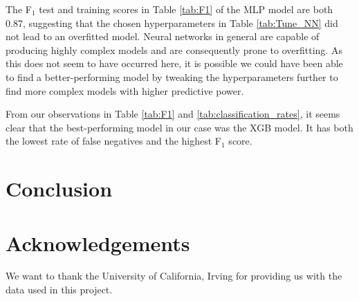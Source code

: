 \documentclass[a4paper, 11pt, twocolumn]{article}
\begin{document}
The F$_1$ test and training scores in Table \ref{tab:F1} of the MLP model are 
both 0.87, suggesting that the chosen hyperparameters in Table 
\ref{tab:Tune_NN} did not lead to an overfitted model. Neural networks in 
general are capable of producing highly complex models and are consequently 
prone to overfitting. As this does not seem to have occurred here, it is possible 
we could have been able to find a better-performing model by tweaking the 
hyperparameters further to find more complex models with higher predictive 
power. 

From our observations in Table \ref{tab:F1} and \ref{tab:classification_rates}, 
it seems clear that the best-performing model in our case was the XGB model. It 
has both the lowest rate of false negatives and the highest F$_1$ score. 

\section{Conclusion}


\section*{Acknowledgements}
We want to thank the University of California, Irving for providing us with the
data used in this project.


%

\end{document}
